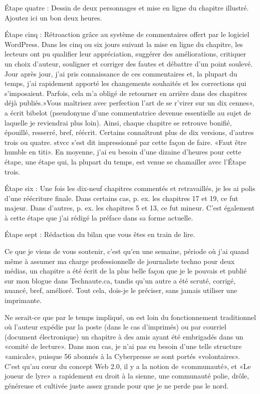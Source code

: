 \begin{Postface}
Étape quatre : Dessin de deux personnages et mise en ligne du chapitre illustré. Ajoutez ici un bon deux heures.

Étape cinq : Rétroaction grâce au système de commentaires offert par le logiciel WordPress. Dans les cinq ou six jours suivant la mise en ligne du chapitre, les lecteurs ont pu qualifier leur appréciation, suggérer des améliorations, critiquer un choix d’auteur, souligner et corriger des fautes et débattre d’un point soulevé. Jour après jour, j’ai pris connaissance de ces commentaires et, la plupart du temps, j’ai rapidement apporté les changements souhaités et les corrections qui s’imposaient. Parfois, cela m’a obligé de retourner en arrière dans des chapitres déjà publiés.»Vous maîtrisez avec perfection l’art de se r’virer sur un dix cennes», a écrit bibelot (pseudonyme d’une commentatrice devenue essentielle au sujet de laquelle je reviendrai plus loin). Ainsi, chaque chapitre se retrouve bonifié, épouillé, resserré, bref, réécrit. Certains connaîtront plus de dix versions, d’autres trois ou quatre. stvcc s’est dit impressionné par cette façon de faire. «Faut être humble en titi». En moyenne, j’ai eu besoin d’une dizaine d’heures pour cette étape, une étape qui, la plupart du temps, est venue se chamailler avec l’Étape trois.

Étape six : Une fois les dix-neuf chapitres commentés et retravaillés, je les ai polis d’une réécriture finale. Dans certains cas, p. ex. les chapitres 17 et 19, ce fut majeur. Dans d’autres, p. ex. les chapitres 5 et 13, ce fut mineur. C’est également à cette étape que j’ai rédigé la préface dans sa forme actuelle.

Étape sept : Rédaction du bilan que vous êtes en train de lire.

Ce que je viens de vous soutenir, c’est qu’en une semaine, période où j’ai quand même à assumer ma charge professionnelle de journaliste techno pour deux médias, un chapitre a été écrit de la plus belle façon que je le pouvais et publié sur mon blogue dans Technaute.ca, tandis qu’un autre a été scruté, corrigé, nuancé, bref, amélioré. Tout cela, dois-je le préciser, sans jamais utiliser une imprimante.

Ne serait-ce que par le temps impliqué, on est loin du fonctionnement traditionnel où l’auteur expédie par la poste (dans le cas d’imprimés) ou par courriel (document électronique) un chapitre à des amis ayant été embrigadés dans un «comité de lecture». Dans mon cas, je n’ai pas eu besoin d’une telle structure «amicale», puisque 56 abonnés à la Cyberpresse se sont portés «volontaires». C’est qu’au cœur du concept Web 2.0, il y a la notion de «communauté», et «Le joueur de lyre» a rapidement eu droit à la sienne, une communauté polie, drôle, généreuse et cultivée juste assez grande pour que je ne perde pas le nord.


\end{Postface}
